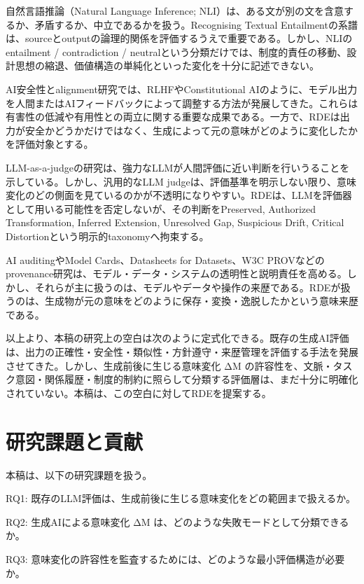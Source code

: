 \documentclass[
  a4paper]{ltjsarticle}
\begin{document}
自然言語推論（Natural Language Inference;
NLI）は、ある文が別の文を含意するか、矛盾するか、中立であるかを扱う。Recognising
Textual
Entailmentの系譜は、sourceとoutputの論理的関係を評価するうえで重要である\cite{dagan2006}。しかし、NLIのentailment / contradiction /
neutralという分類だけでは、制度的責任の移動、設計思想の縮退、価値構造の単純化といった変化を十分に記述できない。

AI安全性とalignment研究では、RLHFやConstitutional
AIのように、モデル出力を人間またはAIフィードバックによって調整する方法が発展してきた\cite{ouyang2022,bai2022}。これらは有害性の低減や有用性との両立に関する重要な成果である。一方で、RDEは出力が安全かどうかだけではなく、生成によって元の意味がどのように変化したかを評価対象とする。

LLM-as-a-judgeの研究は、強力なLLMが人間評価に近い判断を行いうることを示している\cite{zheng2023}。しかし、汎用的なLLM
judgeは、評価基準を明示しない限り、意味変化のどの側面を見ているのかが不透明になりやすい。RDEは、LLMを評価器として用いる可能性を否定しないが、その判断をPreserved,
Authorized Transformation, Inferred Extension, Unresolved Gap,
Suspicious Drift, Critical Distortionという明示的taxonomyへ拘束する。

AI auditingやModel Cards、Datasheets for Datasets、W3C
PROVなどのprovenance研究は、モデル・データ・システムの透明性と説明責任を高める\cite{raji2020,mitchell2019,gebru2021,w3cprov2013}。しかし、それらが主に扱うのは、モデルやデータや操作の来歴である。RDEが扱うのは、生成物が元の意味をどのように保存・変換・逸脱したかという意味来歴である。

以上より、本稿の研究上の空白は次のように定式化できる。既存の生成AI評価は、出力の正確性・安全性・類似性・方針遵守・来歴管理を評価する手法を発展させてきた。しかし、生成前後に生じる意味変化
ΔM
の許容性を、文脈・タスク意図・関係履歴・制度的制約に照らして分類する評価層は、まだ十分に明確化されていない。本稿は、この空白に対してRDEを提案する。

\section{研究課題と貢献}\label{research-questions-and-contributions}

本稿は、以下の研究課題を扱う。

RQ1: 既存のLLM評価は、生成前後に生じる意味変化をどの範囲まで扱えるか。

RQ2: 生成AIによる意味変化 ΔM
は、どのような失敗モードとして分類できるか。

RQ3:
意味変化の許容性を監査するためには、どのような最小評価構造が必要か。
\end{document}
